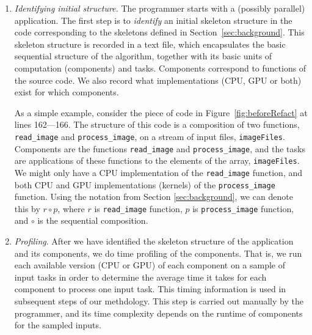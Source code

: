 \documentclass[smallextended]{svjour3}
\begin{document}
\begin{enumerate}
\item \emph{Identifying initial structure.} The programmer starts with a (possibly parallel) application. The first step is to \emph{identify}
 an initial
  skeleton structure in the code corresponding to the skeletons defined in Section~\ref{sec:background}.
  This skeleton structure is recorded in a text file, which encapsulates the basic sequential structure of the
  algorithm, together with its basic units of computation (components) and
  tasks. Components correspond to functions of the source code. 
  We also record what implementations (CPU, GPU or both) exist
  for which components. 

  As a simple example, consider the piece of code in Figure~\ref{fig:beforeRefact} at lines 162---166.
  The structure of this code is a composition of two functions,
  \lstinline|read_image| and \lstinline|process_image|, on a stream of
  input files, \lstinline|imageFiles|. Components are the
  functions \lstinline|read_image| and \lstinline|process_image|, and the
  tasks are applications of these functions to the elements of the array,
  \lstinline|imageFiles|. We might only have a CPU implementation of
  the \lstinline|read_image| function, and both CPU and GPU implementations (kernels)
  of the \lstinline|process_image| function.
  Using the notation from Section
  \ref{sec:background}, we can denote this by $r \circ p$, where $r$ is 
  \lstinline{read_image} function, $p$ is
  \lstinline|process_image| function, and $\circ$ is the sequential
  composition. 


\item \emph{Profiling}. After we have identified the skeleton
  structure of the application and its components, we do time
  profiling of the components. That is, we run each available version (CPU or
  GPU) of each component on a sample of input tasks in order to determine
  the average time it takes for each component to process one input
  task. This timing information is used in subsequent  steps of our
  methdology. This step is carried out manually by the programmer, and
  its time complexity depends on the runtime of components for the
  sampled inputs.


\end{enumerate}
\end{document}
